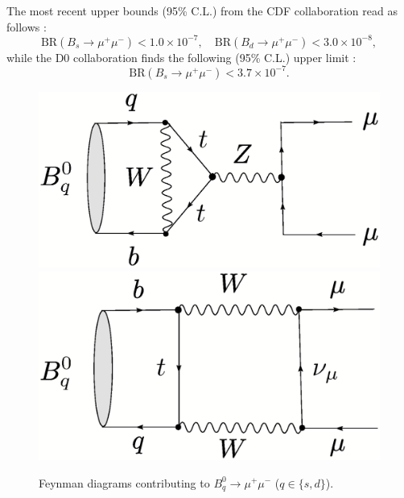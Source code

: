 \documentclass[11pt]{cernrep}
\begin{document}
The most recent upper bounds (95\% C.L.) from the CDF collaboration
read as follows
\cite{CDF-Bmumu}:
\begin{equation}\label{Bmumu-exp-CDF}
\mbox{BR}(B_s\to\mu^+\mu^-)<1.0\times10^{-7}, \quad
\mbox{BR}(B_d\to\mu^+\mu^-)<3.0 \times10^{-8},
\end{equation}
while the D0 collaboration finds the following (95\% C.L.) upper limit \cite{D0-Bmumu}:
\begin{equation}\label{Bmumu-exp-D0}
\mbox{BR}(B_s\to\mu^+\mu^-)<3.7\times10^{-7}.
\end{equation}


\begin{figure}[t]
\centerline{
 \includegraphics[width=4.6truecm]{Bqmumu-pen.ps}
 \hspace*{0.5truecm}
 \includegraphics[width=4.3truecm]{Bqmumu-box.ps}  
 }
\caption{Feynman diagrams contributing to 
$B^0_q\to \mu^+\mu^-$ ($q\in\{s,d\}$).}\label{fig:Bqmumu}
\end{figure}
\end{document}
